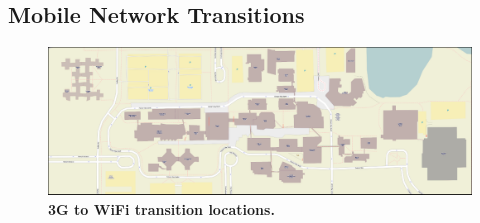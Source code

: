 \subsection{Mobile Network Transitions}
\label{subsec-networktransitions}

\begin{figure}[t]
\includegraphics[width=\textwidth]{./figures/networking/transition_locations/graph.pdf}
\caption{\textbf{3G to WiFi transition locations.}}
\end{figure}
